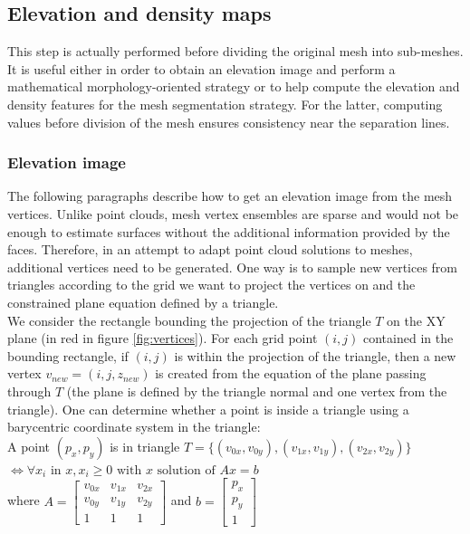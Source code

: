 \documentclass{kththesis}
\begin{document}
\subsection{Elevation and density maps}
This step is actually performed before dividing the original mesh into sub-meshes. It is useful either in order to obtain an elevation image and perform a mathematical morphology-oriented strategy \parencite{det_seg_class, HernandezArtefacts} or to help compute the elevation and density features for the mesh segmentation strategy. For the latter, computing values before division of the mesh ensures consistency near the separation lines.  
\subsubsection{Elevation image}
The following paragraphs describe how to get an elevation image from the mesh vertices. Unlike point clouds, mesh vertex ensembles are sparse and would not be enough to estimate surfaces without the additional information provided by the faces. Therefore, in an attempt to adapt point cloud solutions to meshes, additional vertices need to be generated. One way is to sample new vertices from triangles according to the grid we want to project the vertices on and the constrained plane equation defined by a triangle. \\ 
We consider the rectangle bounding the projection of the triangle $T$ on the XY plane (in red in figure \ref{fig:vertices}). For each grid point $(i,j)$ contained in the bounding rectangle, if $(i,j)$ is within the projection of the triangle, then a new vertex $v_{new}=(i,j, z_{new})$ is created from the equation of the plane passing through $T$ (the plane is defined by the triangle normal and one vertex from the triangle). One can determine whether a point is inside a triangle using a barycentric coordinate system in the triangle: \\ 
A point $(p_x, p_y)$ is in triangle $T= \{ (v_{0x},v_{0y} ), (v_{1x},v_{1y} ),(v_{2x},v_{2y} )\} $ \\
$\iff \forall x_i \text{ in } x, x_i \geq 0 \text{ with $x$ solution of } Ax=b$ \\
where $  A = \begin{bmatrix}
        v_{0x}  & v_{1x} & v_{2x}    \\
    v_{0y} & v_{1y} &   v_{2y} \\
    1  & 1 & 1
\end{bmatrix} $ and $b = \begin{bmatrix} p_x \\ p_y \\ 1 \end{bmatrix}$ \\
\end{document}
